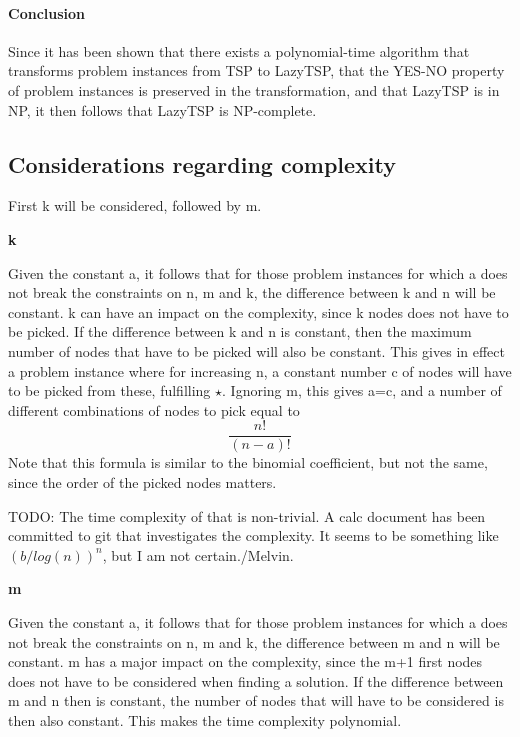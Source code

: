 \paragraph{Conclusion}

Since it has been shown that there exists a polynomial-time algorithm
that transforms problem instances from TSP to LazyTSP, that the
YES-NO property of problem instances is preserved in the transformation,
and that LazyTSP is in NP, it then follows that LazyTSP is NP-complete.

\subsection{Considerations regarding complexity}

First k will be considered, followed by m.

\textbf{k}

Given the constant a, it follows that for those problem instances
for which a does not break the constraints on n, m and k, the difference
between k and n will be constant. k can have an impact on the complexity,
since k nodes does not have to be picked. If the difference between k and n
is constant, then the maximum number of nodes that have to be picked will
also be constant. This gives in effect a problem instance where for increasing n,
a constant number c of nodes will have to be picked from these, fulfilling \(\star\).
Ignoring m, this gives a=c, and a number of different combinations of nodes to pick equal to
\[\frac{n!}{(n-a)!}\]
Note that this formula is similar to the binomial coefficient, but not the same,
since the order of the picked nodes matters.

TODO: The time complexity of that is non-trivial. A calc document has been committed to git
that investigates the complexity. It seems to be something like \((b/log(n))^n\),
but I am not certain./Melvin.

\textbf{m}

Given the constant a, it follows that for those problem instances
for which a does not break the constraints on n, m and k, the difference
between m and n will be constant. m has a major impact on the complexity,
since the m+1 first nodes does not have to be considered when finding a solution.
If the difference between m and n then is constant, the number of nodes that will
have to be considered is then also constant. This makes the time complexity polynomial.

